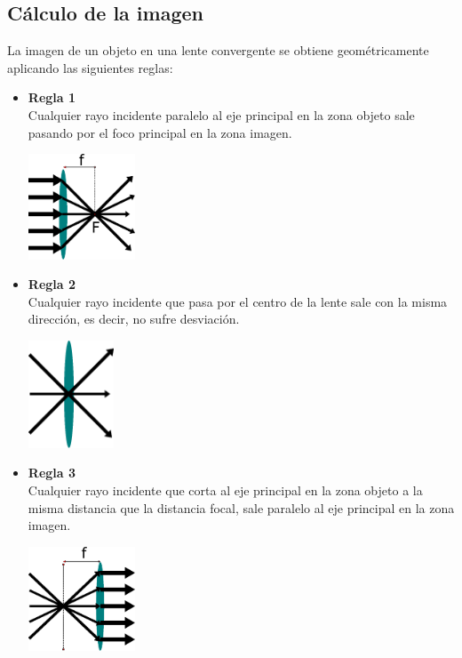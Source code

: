 \subsection{Cálculo de la imagen}
La imagen de un objeto en una lente convergente se obtiene geométricamente aplicando las siguientes reglas:
\begin{itemize}
	\item \textbf{Regla 1}\\
	      Cualquier rayo incidente paralelo al eje principal en la zona objeto sale pasando por el foco principal en la zona imagen.
	      \begin{center}
		      \includegraphics[width=0.25\textwidth]{Contenido/Cuerpo/Capitulo2/Fig1_7.eps}
		      \label{fig:MarcoTeorico:Fig7}

	      \end{center}
	\item \textbf{Regla 2}\\
	      Cualquier rayo incidente que pasa por el centro de la lente sale con la misma dirección, es decir, no sufre desviación.
	      \begin{center}
		      \includegraphics[width=0.2\textwidth]{Contenido/Cuerpo/Capitulo2/Fig1_8.eps}
		      \label{fig:MarcoTeorico:Fig8}
	      \end{center}
	\item \textbf{Regla 3}\\
	      Cualquier rayo incidente que corta al eje principal en la zona objeto a la misma distancia que la distancia focal, sale
	      paralelo al eje principal en la zona imagen.
	      \begin{center}
		      \includegraphics[width=0.25\textwidth]{Contenido/Cuerpo/Capitulo2/Fig1_9.eps}
		      \label{fig:MarcoTeorico:Fig9}
	      \end{center}

\end{itemize}
